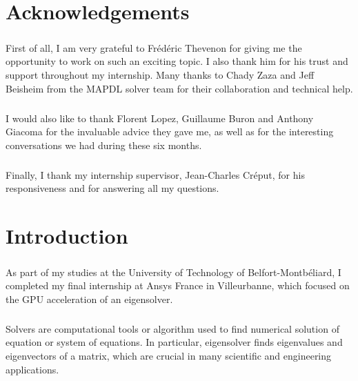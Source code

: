 \chapter*{Acknowledgements} 
\paragraph*{}
First of all, I am very grateful to Frédéric Thevenon for giving me the opportunity to work on such an exciting topic. I also thank him for his trust and support throughout my internship. Many thanks to Chady Zaza and Jeff Beisheim from the MAPDL solver team for their collaboration and technical help.

\paragraph*{}
I would also like to thank Florent Lopez, Guillaume Buron and Anthony Giacoma for the invaluable advice they gave me, as well as for the interesting conversations we had during these six months.

\paragraph*{}
Finally, I thank my internship supervisor, Jean-Charles Créput, for his responsiveness and for answering all my questions.

\chapter*{Introduction} 
\paragraph*{}
As part of my studies at the University of Technology of Belfort-Montbéliard, I completed my final internship at Ansys France in Villeurbanne, which focused on the GPU acceleration of an eigensolver.

\paragraph*{}
Solvers are computational tools or algorithm used to find numerical solution of equation or system of equations. In particular, eigensolver finds eigenvalues and eigenvectors of a matrix, which are crucial in many scientific and engineering applications.

